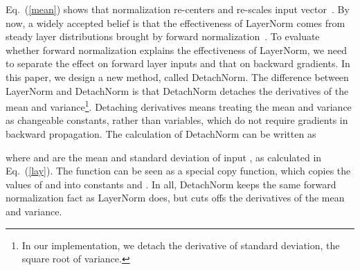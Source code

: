 \documentclass{article}
\begin{document}
Eq.~(\ref{mean}) shows that normalization re-centers and re-scales input vector~. By now,  a widely accepted belief is that the effectiveness of LayerNorm comes from steady layer distributions brought by forward normalization~\citep{lei2016layer}.
To evaluate whether forward normalization explains the effectiveness of LayerNorm, we need to separate the effect on forward layer inputs and that on backward gradients. In this paper, we design a new method, called DetachNorm. The difference between LayerNorm and DetachNorm is that DetachNorm detaches the derivatives of the mean and variance\footnote{In our implementation, we detach the derivative of standard deviation, the square root of variance. }. Detaching  derivatives means treating the mean and variance as changeable constants, rather than variables, which do not require gradients in backward propagation.   The calculation of DetachNorm can be written as 

where  and  are the mean and standard deviation of input , as calculated in Eq.~(\ref{lay}). The function  can be seen as a special copy function, which copies the values of  and  into constants   and . In all, DetachNorm keeps the same forward normalization fact as LayerNorm does, but cuts offs the derivatives of the mean and variance. 
\end{document}

